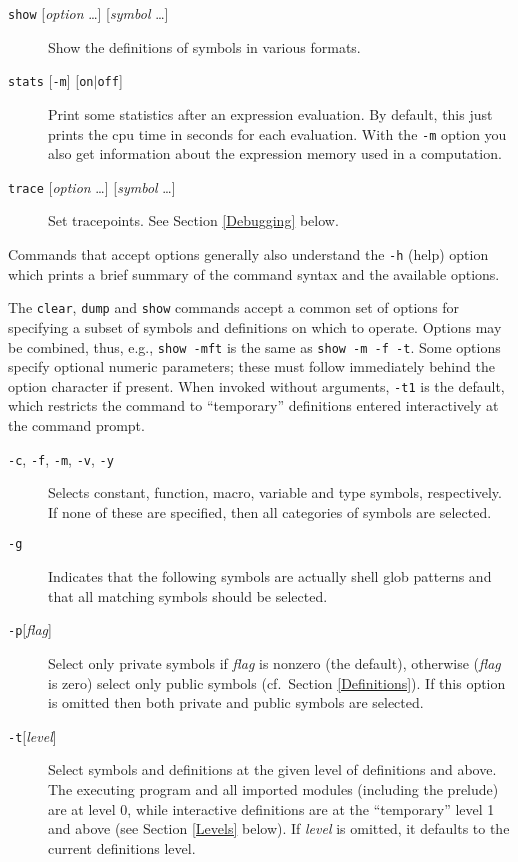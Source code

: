\documentclass[a4paper,12pt]{article}
\newcommand{\nt}[1]{\textrm{\textit{#1\/}}}
\begin{document}
\begin{description}
\item[\rm\texttt{show} {[\nt{option} \ldots{}]} {[\nt{symbol} \ldots{}]}] Show the definitions of symbols in various formats.
\item[\rm\texttt{stats} {[\texttt{-m}]} {[\texttt{on}$|$\texttt{off}]}] Print some statistics after an expression evaluation. By default, this just prints the cpu time in seconds for each evaluation. With the \texttt{-m} option you also get information about the expression memory used in a computation.
\item[\rm\texttt{trace} {[\nt{option} \ldots{}]} {[\nt{symbol} \ldots{}]}] Set tracepoints. See Section \ref{Debugging} below.
\end{description}

Commands that accept options generally also understand the \verb|-h| (help) option which prints a brief summary of the command syntax and the available options.

The \verb|clear|, \verb|dump| and \verb|show| commands accept a common set of options for specifying a subset of symbols and definitions on which to operate. Options may be combined, thus, e.g., \texttt{show -mft} is the same as \texttt{show -m -f -t}. Some options specify optional numeric parameters; these must follow immediately behind the option character if present. When invoked without arguments, \texttt{-t1} is the default, which restricts the command to ``temporary'' definitions entered interactively at the command prompt.

\begin{description}
\item[\rm\texttt{-c}, \texttt{-f}, \texttt{-m}, \texttt{-v}, \texttt{-y}] Selects constant, function, macro, variable and type symbols, respectively. If none of these are specified, then all categories of symbols are selected.
\item[\rm\texttt{-g}] Indicates that the following symbols are actually shell glob patterns and that all matching symbols should be selected.
\item[\rm\texttt{-p}{[\nt{flag}]}] Select only private symbols if \nt{flag} is nonzero (the default), otherwise (\nt{flag} is zero) select only public symbols (cf.\ Section \ref{Definitions}). If this option is omitted then both private and public symbols are selected.
\item[\rm\texttt{-t}{[\nt{level}]}] Select symbols and definitions at the given level of definitions and above. The executing program and all imported modules (including the prelude) are at level 0, while interactive definitions are at the ``temporary'' level 1 and above (see Section \ref{Levels} below). If \nt{level} is omitted, it defaults to the current definitions level.
\end{description}
\end{document}
